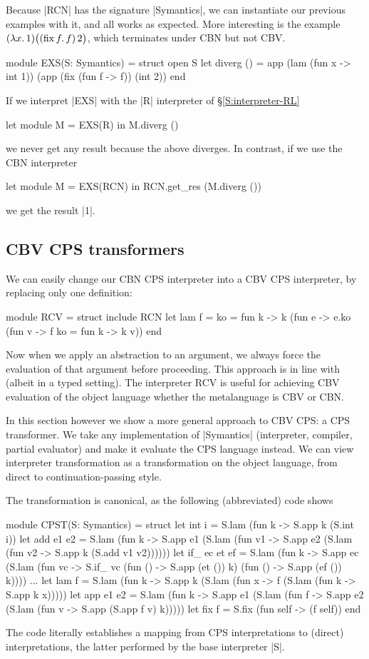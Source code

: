 \documentclass[preprint]{sigplanconf}
\newcommand{\fun}[1]{\mathopen{\lambda\mathord{#1}.\,}}
\newcommand{\fix}[1]{\mathopen{\mathrm{fix\,}\mathord{#1}.\,}}
\begin{document}
Because |RCN| has the signature |Symantics|, we can instantiate our previous
examples with it, and all works as expected.  More interesting
is the example $(\fun{x}1)\bigl((\fix{f}f)\mathinner2\bigr)$, which terminates
under CBN but not CBV\@.
\begin{code}
module EXS(S: Symantics) = struct
 open S
 let diverg () = app (lam (fun x -> int 1)) 
                     (app (fix (fun f -> f)) (int 2))
end
\end{code}
If we interpret |EXS| with the |R| interpreter of
\S\ref{S:interpreter-RL}
\begin{code}
let module M = EXS(R) in M.diverg ()
\end{code}
we never get any result because the above diverges. In contrast, if we use
the CBN interpreter
\begin{code}
let module M = EXS(RCN) in RCN.get_res (M.diverg ())
\end{code}
we get the result |1|.

\subsection{CBV CPS transformers}

We can easily change our CBN CPS interpreter into a CBV CPS
interpreter, by replacing only one definition:
\begin{code}
module RCV = struct
  include RCN
  let lam f = {ko = fun k -> k (fun e ->
    e.ko (fun v -> f {ko = fun k -> k v}))}
end
\end{code}
Now when we apply an abstraction to an argument, we always force
the evaluation of that argument before proceeding. This approach is in
line with \citet{reynolds-relation} (albeit in a typed setting). The interpreter RCV
is useful for achieving CBV evaluation of the object language
whether the metalanguage is CBV or CBN.

In this section however we show a more general approach to CBV CPS:
a CPS transformer. We take any implementation of |Symantics| (interpreter,
compiler, partial evaluator) and make it evaluate the CPS language
instead. We can view interpreter transformation as a
transformation on the object language, from direct to
continuation-passing style.

The transformation is canonical, as the following (abbreviated) code
shows
\begin{code}
module CPST(S: Symantics) = struct
  let int i = S.lam (fun k -> S.app k (S.int i))
  let add e1 e2 = S.lam (fun k ->
    S.app e1 (S.lam (fun v1 ->
    S.app e2 (S.lam (fun v2 -> S.app k (S.add v1 v2))))))
  let if_ ec et ef = S.lam (fun k ->
    S.app ec (S.lam (fun vc ->
    S.if_ vc (fun () -> S.app (et ()) k) (fun () -> S.app (ef ())
    k))))
  ...
  let lam f = S.lam (fun k -> S.app k (S.lam (fun x ->
    f (S.lam (fun k -> S.app k x)))))
  let app e1 e2 = S.lam (fun k -> 
    S.app e1 (S.lam (fun f ->
    S.app e2 (S.lam (fun v -> S.app (S.app f v) k)))))
  let fix f  = S.fix (fun self -> (f self))
end
\end{code}
The code literally establishes a mapping from CPS interpretations to
(direct) interpretations, the latter performed by 
the base interpreter |S|.
\end{document}
